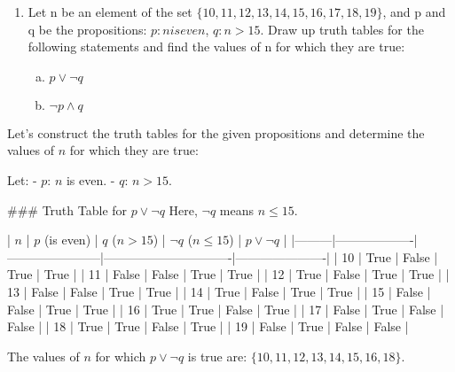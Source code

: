 \begin{enumerate}
\item
Let n be an element of the set $\{10, 11, 12, 13, 14, 15, 16, 17, 18, 19\}$,
and p and q be the propositions:
$p : n is even$, $q : n > 15$.
Draw up truth tables for the following statements and find the values of n for
which they are true:

\begin{enumerate}[(a)]
\item $p \vee \neg q$
\item $\neg p \wedge q$
\end{enumerate}
\end{enumerate}

Let's construct the truth tables for the given propositions and determine the values of \( n \) for which they are true:

Let:
- \( p \): \( n \) is even.
- \( q \): \( n > 15 \).

### Truth Table for \( p \vee \neg q \)
Here, \( \neg q \) means \( n \leq 15 \).

| \( n \) | \( p \) (is even) | \( q \) (\( n > 15 \)) | \( \neg q \) (\( n \leq 15 \)) | \( p \vee \neg q \) |
|---------|-------------------|-----------------------|-------------------------------|----------------------|
| 10      | True              | False                 | True                          | True                 |
| 11      | False             | False                 | True                          | True                 |
| 12      | True              | False                 | True                          | True                 |
| 13      | False             | False                 | True                          | True                 |
| 14      | True              | False                 | True                          | True                 |
| 15      | False             | False                 | True                          | True                 |
| 16      | True              | True                  | False                         | True                 |
| 17      | False             | True                  | False                         | False                |
| 18      | True              | True                  | False                         | True                 |
| 19      | False             | True                  | False                         | False                |

The values of \( n \) for which \( p \vee \neg q \) is true are: \( \{10, 11, 12, 13, 14, 15, 16, 18\} \).

